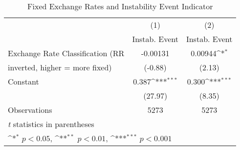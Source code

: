 \begin{table}[htbp]\centering
\def\sym#1{\ifmmode^{#1}\else\(^{#1}\)\fi}
\caption{Fixed Exchange Rates and Instability Event Indicator \label{instabRRalone}}
\begin{tabular}{l*{2}{c}}
\toprule
                                        &\multicolumn{1}{c}{(1)}&\multicolumn{1}{c}{(2)}\\
                                        &\multicolumn{1}{c}{Instab. Event}&\multicolumn{1}{c}{Instab. Event}\\
\midrule
Exchange Rate Classification (RR        & -0.00131         &  0.00944\sym{*}  \\
inverted, higher = more fixed)          &  (-0.88)         &   (2.13)         \\
\addlinespace
Constant                                &    0.387\sym{***}&    0.300\sym{***}\\
                                        &  (27.97)         &   (8.35)         \\
\midrule
Observations                            &     5273         &     5273         \\
\bottomrule
\multicolumn{3}{l}{\footnotesize \textit{t} statistics in parentheses}\\
\multicolumn{3}{l}{\footnotesize \sym{*} \(p<0.05\), \sym{**} \(p<0.01\), \sym{***} \(p<0.001\)}\\
\end{tabular}
\end{table}
